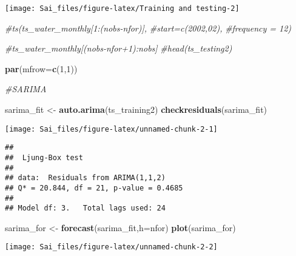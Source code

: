 \documentclass[
]{article}
\newenvironment{Shaded}{\begin{snugshade}}{\end{snugshade}}
\newcommand{\AttributeTok}[1]{\textcolor[rgb]{0.13,0.29,0.53}{#1}}
\newcommand{\CommentTok}[1]{\textcolor[rgb]{0.56,0.35,0.01}{\textit{#1}}}
\newcommand{\DecValTok}[1]{\textcolor[rgb]{0.00,0.00,0.81}{#1}}
\newcommand{\FunctionTok}[1]{\textcolor[rgb]{0.13,0.29,0.53}{\textbf{#1}}}
\newcommand{\NormalTok}[1]{#1}
\newcommand{\OtherTok}[1]{\textcolor[rgb]{0.56,0.35,0.01}{#1}}
\newcommand{\SpecialCharTok}[1]{\textcolor[rgb]{0.81,0.36,0.00}{\textbf{#1}}}
\begin{document}
\begin{center}\texttt{[image: Sai\_files/figure-latex/Training and testing-2]} \end{center}

\begin{Shaded}
\begin{Highlighting}[]
\CommentTok{\#ts(ts\_water\_monthly[1:(nobs{-}nfor)],}
\CommentTok{\#start=c(2002,02),}
\CommentTok{\#frequency = 12)}
  
\CommentTok{\#ts\_water\_monthly[(nobs{-}nfor+1):nobs]}
\CommentTok{\#head(ts\_testing2)}
\end{Highlighting}
\end{Shaded}

\begin{Shaded}
\begin{Highlighting}[]
\FunctionTok{par}\NormalTok{(}\AttributeTok{mfrow=}\FunctionTok{c}\NormalTok{(}\DecValTok{1}\NormalTok{,}\DecValTok{1}\NormalTok{))}

\CommentTok{\#SARIMA}

\NormalTok{sarima\_fit }\OtherTok{\textless{}{-}} \FunctionTok{auto.arima}\NormalTok{(ts\_training2)}
\FunctionTok{checkresiduals}\NormalTok{(sarima\_fit)}
\end{Highlighting}
\end{Shaded}

\begin{center}\texttt{[image: Sai\_files/figure-latex/unnamed-chunk-2-1]} \end{center}

\begin{verbatim}
## 
##  Ljung-Box test
## 
## data:  Residuals from ARIMA(1,1,2)
## Q* = 20.844, df = 21, p-value = 0.4685
## 
## Model df: 3.   Total lags used: 24
\end{verbatim}

\begin{Shaded}
\begin{Highlighting}[]
\NormalTok{sarima\_for }\OtherTok{\textless{}{-}} \FunctionTok{forecast}\NormalTok{(sarima\_fit,}\AttributeTok{h=}\NormalTok{nfor)}
\FunctionTok{plot}\NormalTok{(sarima\_for)}
\end{Highlighting}
\end{Shaded}

\begin{center}\texttt{[image: Sai\_files/figure-latex/unnamed-chunk-2-2]} \end{center}

\begin{Shaded}
\end{Shaded}
\end{document}
